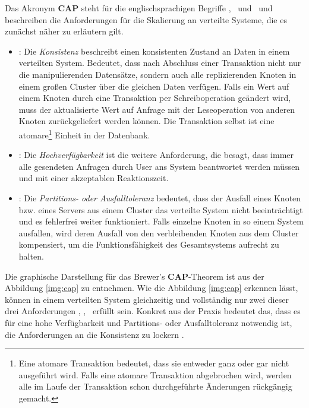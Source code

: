 Das Akronym \textbf{CAP} steht für die englischsprachigen Begriffe  \Cap, \cAp\ und \caP\ und beschreiben die Anforderungen für die Skalierung an verteilte Systeme, die es zunächst näher zu erläutern gilt.
\begin{itemize}
\item \Cap: Die \textit{Konsistenz} beschreibt einen konsistenten Zustand an Daten in einem verteilten System. Bedeutet, dass nach Abschluss einer Transaktion nicht nur die manipulierenden Datensätze, sondern auch alle replizierenden Knoten in einem großen Cluster über die gleichen Daten verfügen. Falls ein Wert auf einem Knoten durch eine Transaktion per Schreiboperation geändert wird, muss der aktualisierte Wert auf Anfrage mit der Leseoperation von anderen Knoten zurückgeliefert werden können. Die Transaktion selbst ist eine atomare\footnote{Eine atomare Transaktion bedeutet, dass sie entweder ganz oder gar nicht ausgeführt wird. Falls eine atomare Transaktion abgebrochen wird, werden alle im Laufe der Transaktion schon durchgeführte Änderungen rückgängig gemacht.} Einheit in der Datenbank.

\item \cAp: Die \textit{Hochverfügbarkeit} ist die weitere Anforderung, die besagt, dass immer alle gesendeten Anfragen durch User ans System beantwortet werden müssen und mit einer akzeptablen Reaktionszeit.

\item \caP: Die \textit{Partitions- oder Ausfalltoleranz} bedeutet, dass der Ausfall eines Knoten bzw. eines Servers aus einem Cluster das verteilte System nicht beeinträchtigt und es fehlerfrei weiter funktioniert. Falls einzelne Knoten in so einem System ausfallen, wird deren Ausfall von den verbleibenden Knoten aus dem Cluster kompensiert, um die Funktionsfähigkeit des Gesamtsystems aufrecht zu halten.

\end{itemize}

Die graphische Darstellung für das Brewer's \textbf{CAP}-Theorem ist aus der Abbildung \ref{img:cap} zu entnehmen. Wie die Abbildung \ref{img:cap} erkennen lässt, können in einem verteilten System gleichzeitig und vollständig nur zwei dieser drei Anforderungen  \Cap, \cAp, \caP\ erfüllt sein. Konkret aus der Praxis bedeutet das, dass es für eine hohe Verfügbarkeit und Partitions- oder Ausfalltoleranz notwendig ist, die Anforderungen an die Konsistenz zu lockern \cite[S. 31]{Edlich.2011}.

